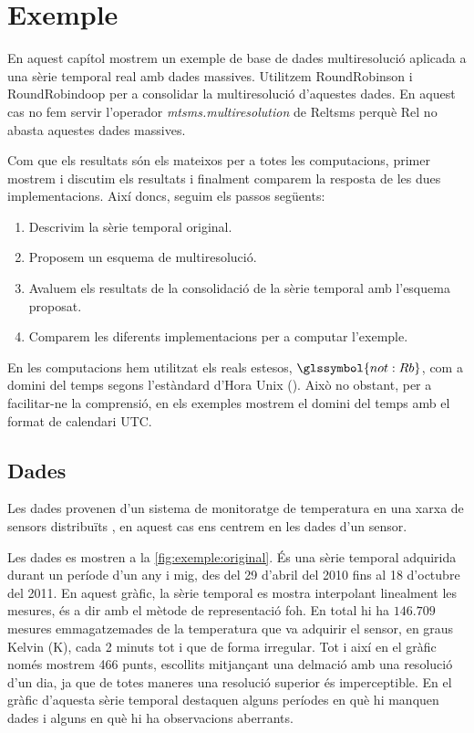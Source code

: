 \chapter{Exemple}
\label{sec:implementacions:exemple}

En aquest capítol mostrem un exemple de base de dades multiresolució
aplicada a una sèrie temporal real amb dades massives.  Utilitzem
RoundRobinson i RoundRobindoop per a consolidar la multiresolució
d'aquestes dades. En aquest cas no fem servir l'operador
\emph{mtsms.multiresolution} de Reltsms perquè Rel no abasta aquestes
dades massives.

Com que els resultats són els mateixos per a totes les computacions,
primer mostrem i discutim els resultats i finalment comparem la
resposta de les dues implementacions. Així doncs, seguim els passos
següents:

\begin{enumerate}
\item Descrivim la sèrie temporal original.
\item Proposem un esquema de multiresolució.
\item Avaluem els resultats de la consolidació de la sèrie temporal
  amb l'esquema proposat.
\item Comparem les diferents implementacions per a computar l'exemple.
\end{enumerate}


En les computacions hem utilitzat els reals estesos,
$\glssymbol{not:Rb}$, com a domini del temps segons l'estàndard d'Hora
Unix (). Això no obstant, per a facilitar-ne la
comprensió, en els exemples mostrem el domini del temps amb el format
de calendari \gls{UTC}.



\section{Dades}


Les dades provenen d'un sistema de monitoratge de temperatura en una
xarxa de sensors distribuïts \parencite{alippi10}, en aquest cas ens
centrem en les dades d'un sensor.

Les dades es mostren a la \autoref{fig:exemple:original}.  És una
sèrie temporal adquirida durant un període d'un any i mig, des del 29
d'abril del 2010 fins al 18 d'octubre del 2011. En aquest gràfic, la
sèrie temporal es mostra interpolant linealment les mesures, és a dir
amb el mètode de representació \gls{foh}.  
%
En total hi ha $146.709$
mesures emmagatzemades de la temperatura que va adquirir el sensor, en
graus Kelvin (K), cada 2 minuts tot i que de forma irregular.  Tot i
així en el gràfic només mostrem 466 punts, escollits mitjançant una
delmació amb una resolució d'un dia, ja que de totes maneres una
resolució superior és imperceptible.  En el gràfic d'aquesta sèrie
temporal destaquen alguns períodes en què hi manquen dades i alguns en
què hi ha observacions aberrants.


